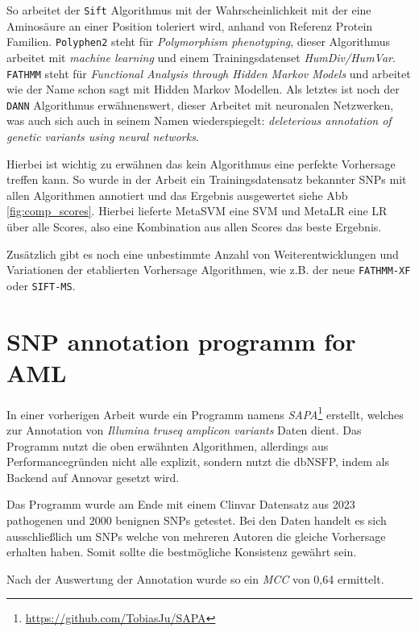So arbeitet der \texttt{Sift}\cite{Vaser.2016} Algorithmus mit der Wahrscheinlichkeit mit der eine Aminosäure an einer Position toleriert wird, anhand von Referenz Protein Familien.
\texttt{Polyphen2}\cite{Adzhubei.2013} steht für \emph{Polymorphism phenotyping}, dieser Algorithmus arbeitet mit \emph{machine learning} und einem Trainingsdatenset \emph{HumDiv/HumVar}.
\texttt{FATHMM}\cite{Shihab.2013} steht für \emph{Functional Analysis through Hidden Markov Models} und arbeitet wie der Name schon sagt mit Hidden Markov Modellen.
Als letztes ist noch der \texttt{DANN} \cite{Quang.2015} Algorithmus erwähnenswert, dieser Arbeitet mit neuronalen Netzwerken, was auch sich auch in seinem Namen wiederspiegelt: \emph{deleterious annotation of genetic variants using neural networks}.

Hierbei ist wichtig zu erwähnen das kein Algorithmus eine perfekte Vorhersage treffen kann. So wurde in der Arbeit \cite{Liu.2016} ein Trainingsdatensatz bekannter SNPs mit allen Algorithmen annotiert und das Ergebnis ausgewertet siehe \ac{Abb} \ref{fig:comp_scores}. Hierbei lieferte MetaSVM eine \ac{SVM} und MetaLR eine \ac{LR} über alle Scores, also eine Kombination aus allen Scores das beste Ergebnis.


Zusätzlich gibt es noch eine unbestimmte Anzahl von Weiterentwicklungen und Variationen der etablierten Vorhersage Algorithmen, wie z.B. der neue \texttt{FATHMM-XF}\cite{Rogers.2017} oder \texttt{SIFT-MS}\cite{Smith.2015}.



\section{SNP annotation programm for AML}
\label{sec:sapa}
In einer vorherigen Arbeit wurde ein Programm namens \emph{SAPA}\footnote{\url{https://github.com/TobiasJu/SAPA}} erstellt, welches zur Annotation von \emph{Illumina truseq amplicon variants} Daten dient. Das Programm nutzt die oben erwähnten Algorithmen, allerdings aus Performancegründen nicht alle explizit, sondern nutzt die dbNSFP\cite{Liu.2016}, indem als Backend auf Annovar\cite{Wang.2010} gesetzt wird. 

Das Programm wurde am Ende mit einem Clinvar Datensatz aus 2023 pathogenen und 2000 benignen \ac{SNPs} getestet. Bei den Daten handelt es sich ausschließlich um \ac{SNPs} welche von mehreren Autoren die gleiche Vorhersage erhalten haben. Somit sollte die bestmögliche Konsistenz gewährt sein.

Nach der Auswertung der Annotation wurde so ein \emph{MCC} von 0,64 ermittelt.